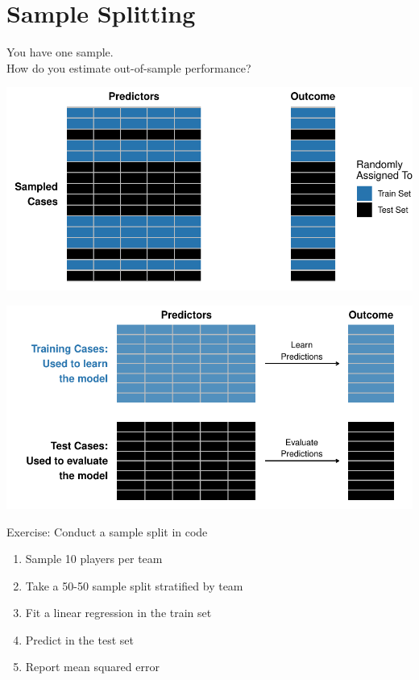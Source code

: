 \documentclass{beamer}
\begin{document}
\section{Sample Splitting}

\begin{frame}
You have one sample.\\
How do you estimate out-of-sample performance?
\end{frame}

\begin{frame}
\includegraphics[width = \textwidth]{figures/randomize_split}
\end{frame}

\begin{frame}
\includegraphics[width = \textwidth]{figures/train_test}
\end{frame}

\begin{frame}{Exercise: Conduct a sample split in code}

\begin{enumerate}
\item Sample 10 players per team
\item Take a 50-50 sample split stratified by team
\item Fit a linear regression in the train set
\item Predict in the test set
\item Report mean squared error
\end{enumerate}

\end{frame}
\end{document}
